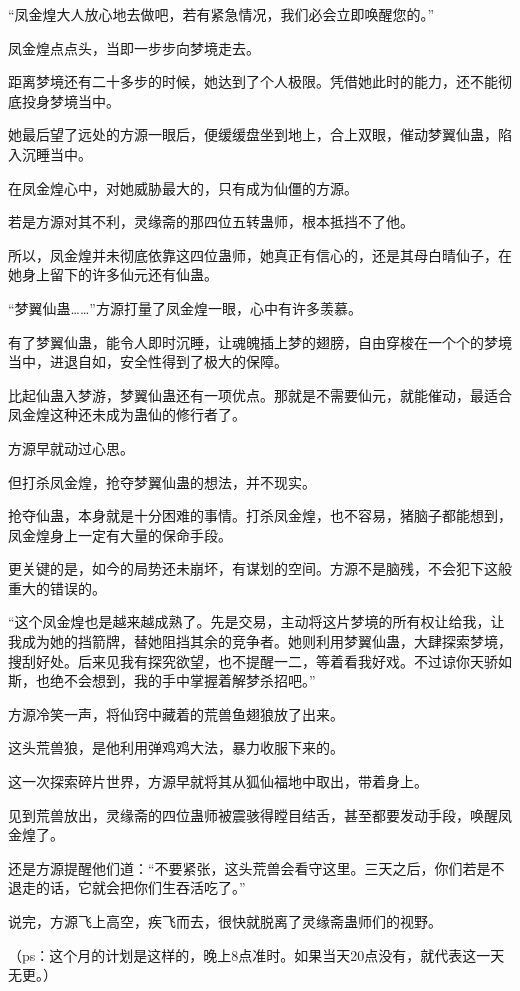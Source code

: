 \begin{this_body}
“凤金煌大人放心地去做吧，若有紧急情况，我们必会立即唤醒您的。”

凤金煌点点头，当即一步步向梦境走去。

距离梦境还有二十多步的时候，她达到了个人极限。凭借她此时的能力，还不能彻底投身梦境当中。

她最后望了远处的方源一眼后，便缓缓盘坐到地上，合上双眼，催动梦翼仙蛊，陷入沉睡当中。

在凤金煌心中，对她威胁最大的，只有成为仙僵的方源。

若是方源对其不利，灵缘斋的那四位五转蛊师，根本抵挡不了他。

所以，凤金煌并未彻底依靠这四位蛊师，她真正有信心的，还是其母白晴仙子，在她身上留下的许多仙元还有仙蛊。

“梦翼仙蛊……”方源打量了凤金煌一眼，心中有许多羡慕。

有了梦翼仙蛊，能令人即时沉睡，让魂魄插上梦的翅膀，自由穿梭在一个个的梦境当中，进退自如，安全性得到了极大的保障。

比起仙蛊入梦游，梦翼仙蛊还有一项优点。那就是不需要仙元，就能催动，最适合凤金煌这种还未成为蛊仙的修行者了。

方源早就动过心思。

但打杀凤金煌，抢夺梦翼仙蛊的想法，并不现实。

抢夺仙蛊，本身就是十分困难的事情。打杀凤金煌，也不容易，猪脑子都能想到，凤金煌身上一定有大量的保命手段。

更关键的是，如今的局势还未崩坏，有谋划的空间。方源不是脑残，不会犯下这般重大的错误的。

“这个凤金煌也是越来越成熟了。先是交易，主动将这片梦境的所有权让给我，让我成为她的挡箭牌，替她阻挡其余的竞争者。她则利用梦翼仙蛊，大肆探索梦境，搜刮好处。后来见我有探究欲望，也不提醒一二，等着看我好戏。不过谅你天骄如斯，也绝不会想到，我的手中掌握着解梦杀招吧。”

方源冷笑一声，将仙窍中藏着的荒兽鱼翅狼放了出来。

这头荒兽狼，是他利用弹鸡鸡大法，暴力收服下来的。

这一次探索碎片世界，方源早就将其从狐仙福地中取出，带着身上。

见到荒兽放出，灵缘斋的四位蛊师被震骇得瞠目结舌，甚至都要发动手段，唤醒凤金煌了。

还是方源提醒他们道：“不要紧张，这头荒兽会看守这里。三天之后，你们若是不退走的话，它就会把你们生吞活吃了。”

说完，方源飞上高空，疾飞而去，很快就脱离了灵缘斋蛊师们的视野。

（ps：这个月的计划是这样的，晚上8点准时。如果当天20点没有，就代表这一天无更。）

\end{this_body}

